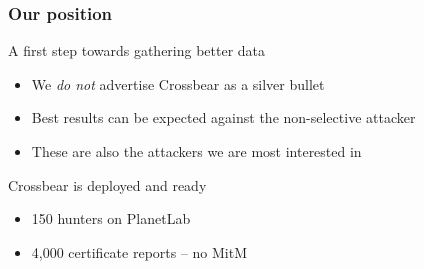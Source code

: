 \begin{frame}
\frametitle{Our position}
  \begin{block}{A first step towards gathering better data}
    \begin{itemize}
       \item We \textit{do not} advertise Crossbear as a silver bullet
       \item Best results can be expected against the non-selective attacker
       \item These are also the attackers we are most interested in
     \end{itemize}
  \end{block}
  \begin{block}{Crossbear is deployed and ready}
    \begin{itemize}
      \item 150 hunters on PlanetLab
      \item 4,000 certificate reports -- no MitM
    \end{itemize}  
  \end{block}
\end{frame}

